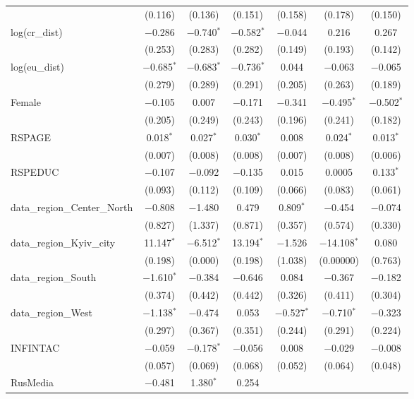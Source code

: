 \begin{table}[!htbp]
\begin{tabular}{@{\extracolsep{1pt}}lcccccc}
  & (0.116) & (0.136) & (0.151) & (0.158) & (0.178) & (0.150) \\ 
  log(cr\_dist) & $-$0.286 & $-$0.740$^{*}$ & $-$0.582$^{*}$ & $-$0.044 & 0.216 & 0.267 \\ 
  & (0.253) & (0.283) & (0.282) & (0.149) & (0.193) & (0.142) \\ 
  log(eu\_dist) & $-$0.685$^{*}$ & $-$0.683$^{*}$ & $-$0.736$^{*}$ & 0.044 & $-$0.063 & $-$0.065 \\ 
  & (0.279) & (0.289) & (0.291) & (0.205) & (0.263) & (0.189) \\ 
  Female & $-$0.105 & 0.007 & $-$0.171 & $-$0.341 & $-$0.495$^{*}$ & $-$0.502$^{*}$ \\ 
  & (0.205) & (0.249) & (0.243) & (0.196) & (0.241) & (0.182) \\ 
  RSPAGE & 0.018$^{*}$ & 0.027$^{*}$ & 0.030$^{*}$ & 0.008 & 0.024$^{*}$ & 0.013$^{*}$ \\ 
  & (0.007) & (0.008) & (0.008) & (0.007) & (0.008) & (0.006) \\ 
  RSPEDUC & $-$0.107 & $-$0.092 & $-$0.135 & 0.015 & 0.0005 & 0.133$^{*}$ \\ 
  & (0.093) & (0.112) & (0.109) & (0.066) & (0.083) & (0.061) \\ 
  data\_region\_Center\_North & $-$0.808 & $-$1.480 & 0.479 & 0.809$^{*}$ & $-$0.454 & $-$0.074 \\ 
  & (0.827) & (1.337) & (0.871) & (0.357) & (0.574) & (0.330) \\ 
  data\_region\_Kyiv\_city & 11.147$^{*}$ & $-$6.512$^{*}$ & 13.194$^{*}$ & $-$1.526 & $-$14.108$^{*}$ & 0.080 \\ 
  & (0.198) & (0.000) & (0.198) & (1.038) & (0.00000) & (0.763) \\ 
  data\_region\_South & $-$1.610$^{*}$ & $-$0.384 & $-$0.646 & 0.084 & $-$0.367 & $-$0.182 \\ 
  & (0.374) & (0.442) & (0.442) & (0.326) & (0.411) & (0.304) \\ 
  data\_region\_West & $-$1.138$^{*}$ & $-$0.474 & 0.053 & $-$0.527$^{*}$ & $-$0.710$^{*}$ & $-$0.323 \\ 
  & (0.297) & (0.367) & (0.351) & (0.244) & (0.291) & (0.224) \\ 
  INFINTAC & $-$0.059 & $-$0.178$^{*}$ & $-$0.056 & 0.008 & $-$0.029 & $-$0.008 \\ 
  & (0.057) & (0.069) & (0.068) & (0.052) & (0.064) & (0.048) \\ 
  RusMedia & $-$0.481 & 1.380$^{*}$ & 0.254 &  &  &  \\ 

\end{tabular}
\end{table}
